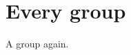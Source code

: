 \documentclass{article}
\begin{document}
\tableofcontents
\section{Every \gls{group}}
A \gls{group} again.

\printglossaries
\end{document}
